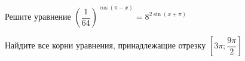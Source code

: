 \begin{ex}
	\begin{condition}
		\begin{enumcols}[label=\asbuk*)]
			\item Решите уравнение \( \left(\dfrac{1}{64}\right)^{\cos{\left(\pi - x\right)}} = 8^{2\sin {\left(x +\pi\right)}} \)
			\item Найдите все корни уравнения, принадлежащие отрезку \( \left[3\pi;\dfrac{9\pi}{2}\right] \)
		\end{enumcols}
	\end{condition}
\end{ex}